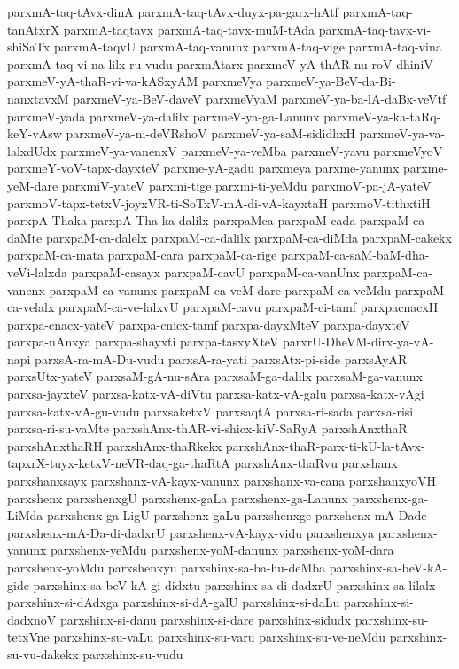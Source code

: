 {parxmA-taq-tAvx-dinA
parxmA-taq-tAvx-duyx-pa-garx-hAtf
parxmA-taq-tanAtxrX
parxmA-taqtavx
parxmA-taq-tavx-muM-tAda
parxmA-taq-tavx-vi-shiSaTx
parxmA-taqvU
parxmA-taq-vanunx
parxmA-taq-vige
parxmA-taq-vina
parxmA-taq-vi-na-lilx-ru-vudu
parxmAtarx
parxmeV-yA-thAR-nu-roV-dhiniV
parxmeV-yA-thaR-vi-va-kASxyAM
parxmeVya
parxmeV-ya-BeV-da-Bi-nanxtavxM
parxmeV-ya-BeV-daveV
parxmeVyaM
parxmeV-ya-ba-lA-daBx-veVtf
parxmeV-yada
parxmeV-ya-dalilx
parxmeV-ya-ga-Lanunx
parxmeV-ya-ka-taRq-keY-vAsw
parxmeV-ya-ni-deVRshoV
parxmeV-ya-saM-sididhxH
parxmeV-ya-va-lalxdUdx
parxmeV-ya-vanenxV
parxmeV-ya-veMba
parxmeV-yavu
parxmeVyoV
parxmeY-voV-tapx-dayxteV
parxme-yA-gadu
parxmeya
parxme-yanunx
parxme-yeM-dare
parxmiV-yateV
parxmi-tige
parxmi-ti-yeMdu
parxmoV-pa-jA-yateV
parxmoV-tapx-tetxV-joyxVR-ti-SoTxV-mA-di-vA-kayxtaH
parxmoV-tithxtiH
parxpA-Thaka
parxpA-Tha-ka-dalilx
parxpaMca
parxpaM-cada
parxpaM-ca-daMte
parxpaM-ca-dalelx
parxpaM-ca-dalilx
parxpaM-ca-diMda
parxpaM-cakekx
parxpaM-ca-mata
parxpaM-cara
parxpaM-ca-rige
parxpaM-ca-saM-baM-dha-veVi-lalxda
parxpaM-casayx
parxpaM-cavU
parxpaM-ca-vanUnx
parxpaM-ca-vanenx
parxpaM-ca-vanunx
parxpaM-ca-veM-dare
parxpaM-ca-veMdu
parxpaM-ca-velalx
parxpaM-ca-ve-lalxvU
parxpaM-cavu
parxpaM-ci-tamf
parxpacnacxH
parxpa-cnacx-yateV
parxpa-cnicx-tamf
parxpa-dayxMteV
parxpa-dayxteV
parxpa-nAnxya
parxpa-shayxti
parxpa-tasxyXteV
parxrU-DheVM-dirx-ya-vA-napi
parxsA-ra-mA-Du-vudu
parxsA-ra-yati
parxsAtx-pi-side
parxsAyAR
parxsUtx-yateV
parxsaM-gA-nu-sAra
parxsaM-ga-dalilx
parxsaM-ga-vanunx
parxsa-jayxteV
parxsa-katx-vA-diVtu
parxsa-katx-vA-galu
parxsa-katx-vAgi
parxsa-katx-vA-gu-vudu
parxsaketxV
parxsaqtA
parxsa-ri-sada
parxsa-risi
parxsa-ri-su-vaMte
parxshAnx-thAR-vi-shicx-kiV-SaRyA
parxshAnxthaR
parxshAnxthaRH
parxshAnx-thaRkekx
parxshAnx-thaR-parx-ti-kU-la-tAvx-tapxrX-tuyx-ketxV-neVR-daq-ga-thaRtA
parxshAnx-thaRvu
parxshanx
parxshanxsayx
parxshanx-vA-kayx-vanunx
parxshanx-va-cana
parxshanxyoVH
parxshenx
parxshenxgU
parxshenx-gaLa
parxshenx-ga-Lanunx
parxshenx-ga-LiMda
parxshenx-ga-LigU
parxshenx-gaLu
parxshenxge
parxshenx-mA-Dade
parxshenx-mA-Da-di-dadxrU
parxshenx-vA-kayx-vidu
parxshenxya
parxshenx-yanunx
parxshenx-yeMdu
parxshenx-yoM-danunx
parxshenx-yoM-dara
parxshenx-yoMdu
parxshenxyu
parxshinx-sa-ba-hu-deMba
parxshinx-sa-beV-kA-gide
parxshinx-sa-beV-kA-gi-didxtu
parxshinx-sa-di-dadxrU
parxshinx-sa-lilalx
parxshinx-si-dAdxga
parxshinx-si-dA-galU
parxshinx-si-daLu
parxshinx-si-dadxnoV
parxshinx-si-danu
parxshinx-si-dare
parxshinx-sidudx
parxshinx-su-tetxVne
parxshinx-su-vaLu
parxshinx-su-varu
parxshinx-su-ve-neMdu
parxshinx-su-vu-dakekx
parxshinx-su-vudu
}
